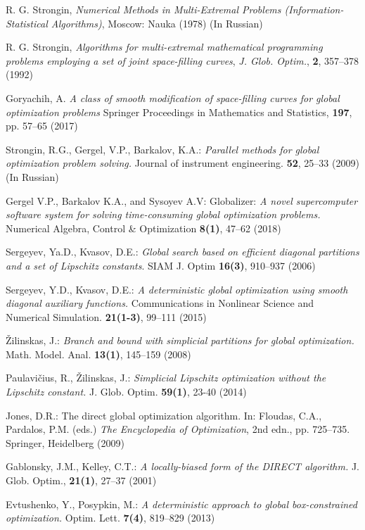 \documentclass[procedia]{easychair}
\begin{document}
\begin{thebibliography}{107}

\newblock R. G. Strongin,
\newblock \emph{Numerical Methods in Multi-Extremal Problems (Information-Statistical Algorithms)},
\newblock Moscow: Nauka (1978) (In Russian)

\newblock R. G. Strongin,
\newblock \emph{\emph{Algorithms for multi-extremal mathematical programming problems
employing a set of joint space-filling curves}},
\newblock \emph{J. Glob. Optim.}, \textbf{2}, 357--378 (1992)

\newblock Goryachih, A.
\newblock \emph{A class of smooth modification of space-filling curves for global optimization
problems}
\newblock Springer Proceedings in Mathematics and Statistics, \textbf{197}, pp. 57--65 (2017)

Strongin, R.G., Gergel, V.P., Barkalov, K.A.: \emph{Parallel methods for global optimization problem
solving.} Journal of instrument engineering. \textbf{52}, 25--33 (2009) (In Russian)

Gergel V.P., Barkalov K.A., and Sysoyev A.V: Globalizer: \emph{A novel supercomputer software
system for solving time-consuming global optimization problems.} Numerical Algebra, Control
\& Optimization \textbf{8(1)}, 47--62 (2018)

Sergeyev, Ya.D., Kvasov, D.E.: \emph{Global search based on efficient diagonal partitions and a set
of Lipschitz constants}. SIAM J. Optim \textbf{16(3)}, 910--937 (2006)

Sergeyev, Y.D., Kvasov, D.E.: \emph{A deterministic global optimization using smooth diagonal
auxiliary functions.} Communications in Nonlinear Science and Numerical Simulation. \textbf{21(1-3)},
99--111 (2015)

\v Zilinskas, J.: \emph{Branch and bound with simplicial partitions for global optimization.} Math.
Model. Anal. \textbf{13(1)}, 145--159 (2008)

Paulavi\v cius, R., \v Zilinskas, J.: \emph{Simplicial Lipschitz optimization without the Lipschitz
constant.} J. Glob. Optim. \textbf{59(1)}, 23-40 (2014)

Jones, D.R.: The direct global optimization algorithm. In: Floudas, C.A., Pardalos, P.M.
(eds.) \emph{The Encyclopedia of Optimization}, 2nd edn., pp. 725--735. Springer, Heidelberg
(2009)

Gablonsky, J.M., Kelley, C.T.: \emph{A locally-biased form of the DIRECT algorithm.} J. Glob.
Optim., \textbf{21(1)}, 27--37 (2001)

Evtushenko, Y., Posypkin, M.: \emph{A deterministic approach to global box-constrained
optimization.} Optim. Lett. \textbf{7(4)}, 819--829 (2013)

\end{thebibliography}

\end{document}
